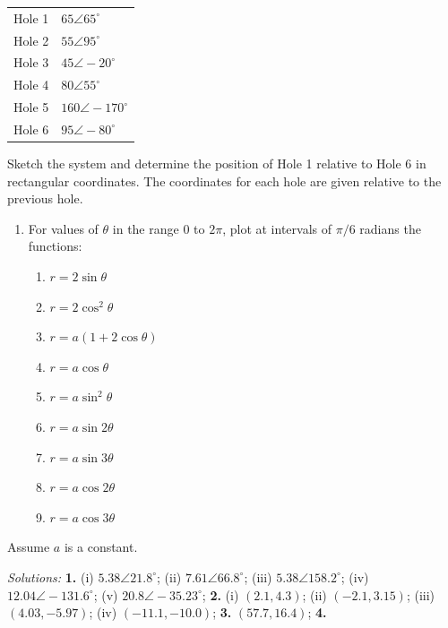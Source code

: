 \documentclass[
  english,
  12pt,
  oneside]{book}
\newcounter{none} %
\providecommand{\tightlist}{%
  \setlength{\itemsep}{0pt}\setlength{\parskip}{0pt}}
\theoremstyle{definition}
\theoremstyle{definition}
\theoremstyle{definition}
\theoremstyle{definition}
\theoremstyle{remark}
\begin{document}
{\def\LTcaptype{none} %
\begin{longtable}[]{@{}
  >{\raggedright\arraybackslash}p{}
  >{\raggedright\arraybackslash}p{}@{}}
\toprule\noalign{}
\endhead
\bottomrule\noalign{}
\endlastfoot
Hole 1 & \(65 \angle 65^\circ\) \\
Hole 2 & \(55 \angle 95^\circ\) \\
Hole 3 & \(45 \angle -20^\circ\) \\
Hole 4 & \(80 \angle 55^\circ\) \\
Hole 5 & \(160 \angle -170^\circ\) \\
Hole 6 & \(95 \angle -80^\circ\) \\
\end{longtable}
}

Sketch the system and determine the position of Hole 1 relative to Hole 6 in rectangular coordinates. The coordinates for each hole are given relative to the previous hole.

\begin{enumerate}
\def\labelenumi{\arabic{enumi}.}
\setcounter{enumi}{3}
\item
  For values of \(\theta\) in the range \(0\) to \(2\pi\), plot at intervals of \(\pi/6\) radians the functions:

  \begin{enumerate}
  \def\labelenumii{\roman{enumii})}
  \tightlist
  \item
    \(r = 2 \sin \theta\)
  \item
    \(r = 2 \cos^2\theta\)
  \item
    \(r = a(1 + 2 \cos \theta)\)
  \item
    \(r = a \cos \theta\)
  \item
    \(r = a \sin^2\theta\)
  \item
    \(r = a \sin 2\theta\)
  \item
    \(r = a \sin 3\theta\)
  \item
    \(r = a \cos 2\theta\)
  \item
    \(r = a \cos 3\theta\)
  \end{enumerate}
\end{enumerate}

Assume \(a\) is a constant.

\emph{Solutions:}
\textbf{1.} (i) \(5.38\angle21.8^\circ\);
(ii) \(7.61\angle66.8^\circ\);
(iii) \(5.38\angle158.2^\circ\);
(iv) \(12.04\angle-131.6^\circ\);
(v) \(20.8\angle -35.23^\circ\);
\textbf{2.}
(i) \((2.1,4.3)\);
(ii) \((-2.1,3.15)\);
(iii) \((4.03,-5.97)\);
(iv) \((-11.1,-10.0)\);
\textbf{3.} \((57.7,16.4)\);
\textbf{4.}
\end{document}
